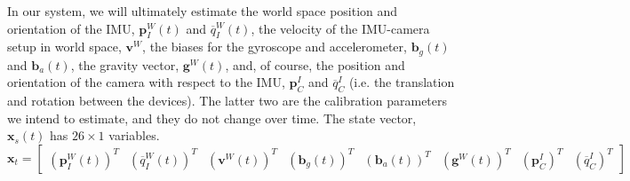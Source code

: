 \documentclass[letterpaper]{article}
\newcommand{\bb}[1]{\mathbf{#1}}
\begin{document}
In our system, we will ultimately estimate the world space position
and orientation of the IMU, $\bb{p}_I^W(t)$ and
${\overline{q}}_I^W(t)$, the velocity of the IMU-camera setup in world
space, $\bb{v}^W$, the biases for the gyroscope and accelerometer,
$\bb{b}_g(t)$ and $\bb{b}_a(t)$, the gravity vector, $\bb{g}^W(t)$,
and, of course, the position and orientation of the camera with
respect to the IMU, $\bb{p}_C^I$ and $\overline{q}_C^I$ (i.e. the
translation and rotation between the devices). The latter two are the
calibration parameters we intend to estimate, and they do not change
over time. The state vector, $\bb{x}_s(t)$ has $26 \times 1$
variables.
\begin{equation}
\bb{x}_t=\begin{bmatrix} (\bb{p}_I^W(t))^T & ({\overline{q}}_I^W(t))^T  & (\bb{v}^W(t))^T  & (\bb{b}_g(t))^T &  (\bb{b}_a(t))^T & (\bb{g}^W(t))^T  & (\bb{p}_C^I)^T & (\overline{q}_C^I)^T\end{bmatrix}
\label{eq:UKF-state}
\end{equation}
\end{document}
